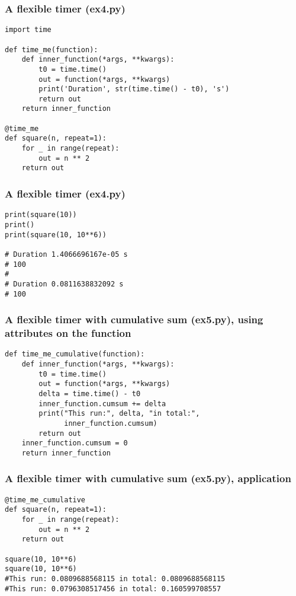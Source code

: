 \documentclass{beamer}
\begin{document}
\begin{frame}[fragile]
  \frametitle{A flexible timer (ex4.py)}
\begin{verbatim}
import time

def time_me(function):
    def inner_function(*args, **kwargs):
        t0 = time.time()
        out = function(*args, **kwargs)
        print('Duration', str(time.time() - t0), 's')
        return out
    return inner_function

@time_me
def square(n, repeat=1):
    for _ in range(repeat):
        out = n ** 2
    return out
\end{verbatim}
\end{frame}

\begin{frame}[fragile]
  \frametitle{A flexible timer (ex4.py)}
\begin{verbatim}
print(square(10))
print()
print(square(10, 10**6))

# Duration 1.4066696167e-05 s
# 100
#
# Duration 0.0811638832092 s
# 100
\end{verbatim}
\end{frame}

\begin{frame}[fragile]
  \frametitle{A flexible timer with cumulative sum (ex5.py), using attributes
    on the function}
\begin{verbatim}
def time_me_cumulative(function):
    def inner_function(*args, **kwargs):
        t0 = time.time()
        out = function(*args, **kwargs)
        delta = time.time() - t0
        inner_function.cumsum += delta
        print("This run:", delta, "in total:",
              inner_function.cumsum)
        return out
    inner_function.cumsum = 0
    return inner_function
\end{verbatim}
\end{frame}

\begin{frame}[fragile]
  \frametitle{A flexible timer with cumulative sum (ex5.py), application}
\begin{verbatim}
@time_me_cumulative
def square(n, repeat=1):
    for _ in range(repeat):
        out = n ** 2
    return out

square(10, 10**6)
square(10, 10**6)
#This run: 0.0809688568115 in total: 0.0809688568115
#This run: 0.0796308517456 in total: 0.160599708557
\end{verbatim}
\end{frame}
\end{document}

